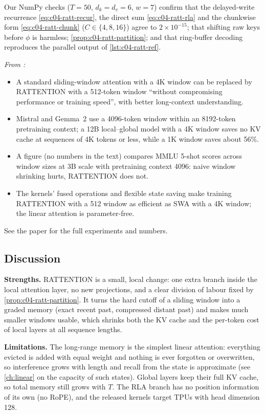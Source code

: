 Our NumPy checks ($T=50$, $d_k=d_v=6$, $w=7$) confirm that the delayed-write recurrence
\eqref{eq:c04-ratt-recur}, the direct sum \eqref{eq:c04-ratt-rla} and the chunkwise form
\eqref{eq:c04-ratt-chunk} ($C\in\{4,8,16\}$) agree to $2\times10^{-15}$; that shifting raw keys
before $\phi$ is harmless; \cref{prop:c04-ratt-partition}; and that ring-buffer decoding reproduces
the parallel output of \cref{lst:c04-ratt-ref}.

\begin{results}
\emph{From :}
\begin{itemize}
  \item A standard sliding-window attention with a 4K window can be replaced by RATTENTION with a
  512-token window ``without compromising performance or training speed'', with better
  long-context understanding.
  \item Mistral and Gemma~2 use a 4096-token window within an 8192-token pretraining context; a
  12B local--global model with a 4K window saves no KV cache at sequences of 4K tokens or less,
  while a 1K window saves about 56\%.
  \item A figure (no numbers in the text) compares MMLU 5-shot scores across window sizes at 3B
  scale with pretraining context 4096: naive window shrinking hurts, RATTENTION does not.
  \item The kernels' fused operations and flexible state saving make training RATTENTION with a
  512 window as efficient as SWA with a 4K window; the linear attention is parameter-free.
\end{itemize}
See the paper for the full experiments and numbers.
\end{results}

\subsection{Discussion}

\textbf{Strengths.} RATTENTION is a small, local change: one extra branch inside the local
attention layer, no new projections, and a clear division of labour fixed by
\cref{prop:c04-ratt-partition}. It turns the hard cutoff of a sliding window into a graded memory
(exact recent past, compressed distant past) and makes much smaller windows usable, which shrinks
both the KV cache and the per-token cost of local layers at all sequence lengths.

\textbf{Limitations.} The long-range memory is the simplest linear attention: everything evicted
is added with equal weight and nothing is ever forgotten or overwritten, so interference grows with
length and recall from the state is approximate (see \cref{ch:linear} on the capacity of such
states).
Global layers keep their full KV cache, so total memory still grows with $T$. The RLA branch has
no position information of its own (no RoPE), and the released kernels target TPUs with head
dimension 128.

